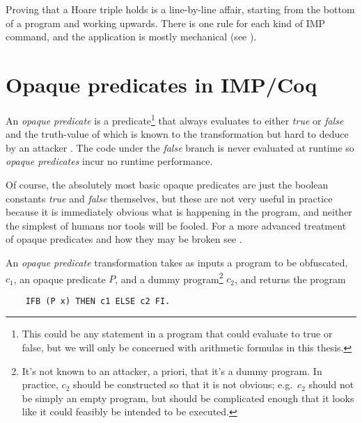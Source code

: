 \documentclass[compsoc,conference,a4paper,10pt,times]{IEEEtran}
\begin{document}
Proving that a Hoare triple holds is a line-by-line affair, starting from the bottom of a program and working upwards.  There is one rule for each kind of IMP command, and the application is mostly mechanical (see \cite{SFV2}).

\section{Opaque predicates in IMP/Coq}
	An \emph{opaque predicate} \cite{CoNa} is a predicate\footnote{This could be any statement in a program that could evaluate to true or false, but we will only be concerned with arithmetic formulas in this thesis.} that always evaluates to either \emph{true} or \emph{false} and the truth-value of which is known to the transformation but hard to deduce by an attacker \cite{Prada}. The code under the \emph{false} branch is never evaluated at runtime so \emph{opaque predicates} incur no runtime performance.

Of course, the absolutely most basic opaque predicates are just the boolean constants \emph{true} and \emph{false} themselves, but these are not very useful in practice because it is immediately obvious what is happening in the program, and neither the simplest of humans nor tools will be fooled. For a more advanced treatment of opaque predicates and how they may be broken see \cite{Prada}.


An  \emph{opaque predicate} transformation takes as inputs a program to be obfuscated, $c_1$, an opaque predicate $P$, and a dummy program\footnote{It's not known to an attacker, a priori, that it's a dummy program.  In practice, $c_2$ should be constructed so that it is not obvious; e.g.\ $c_2$ should not be simply an empty program, but should be complicated enough that it looks like it could feasibly be intended to be executed.} $c_2$, and returns the program
\begin{verbatim}
    IFB (P x) THEN c1 ELSE c2 FI.
\end{verbatim}
\end{document}
